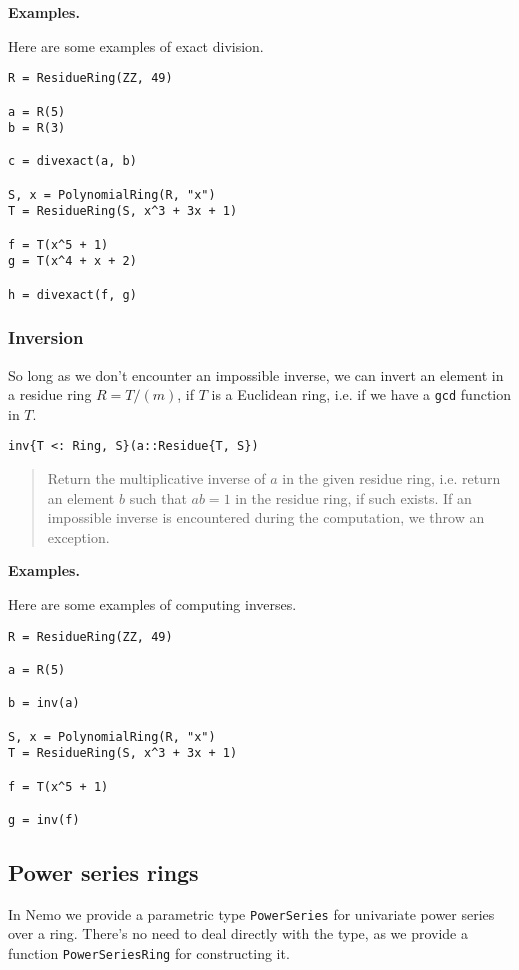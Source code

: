 \documentclass[a4paper,10pt]{article}
\newcommand{\code}{\lstinline}
\newcommand{\desc}[1]{\vspace{-3mm}\begin{quote}#1\end{quote}}
\begin{document}
{{{\textbf{Examples.}

Here are some examples of exact division.

\begin{lstlisting}
R = ResidueRing(ZZ, 49)

a = R(5)
b = R(3)

c = divexact(a, b)

S, x = PolynomialRing(R, "x")
T = ResidueRing(S, x^3 + 3x + 1)

f = T(x^5 + 1)
g = T(x^4 + x + 2)

h = divexact(f, g)
\end{lstlisting}

\subsubsection{Inversion}

So long as we don't encounter an impossible inverse, we can
invert an element in a residue ring $R = T/(m)$, if $T$ is a
Euclidean ring, i.e. if we have a \code{gcd} function in $T$.

\begin{lstlisting}
inv{T <: Ring, S}(a::Residue{T, S})
\end{lstlisting}

\desc{Return the multiplicative inverse of $a$ in the given residue
ring, i.e. return an element $b$ such that $ab = 1$ in the residue ring,
if such exists. If an impossible inverse is encountered during the
computation, we throw an exception.}

\textbf{Examples.}

Here are some examples of computing inverses.

\begin{lstlisting}
R = ResidueRing(ZZ, 49)

a = R(5)

b = inv(a)

S, x = PolynomialRing(R, "x")
T = ResidueRing(S, x^3 + 3x + 1)

f = T(x^5 + 1)

g = inv(f)
\end{lstlisting}

\subsection{Power series rings}

In Nemo we provide a parametric type \code{PowerSeries} for univariate power
series over a ring. There's no need to deal directly with the type, as we
provide a function \code{PowerSeriesRing} for constructing it.

}}}
\end{document}
